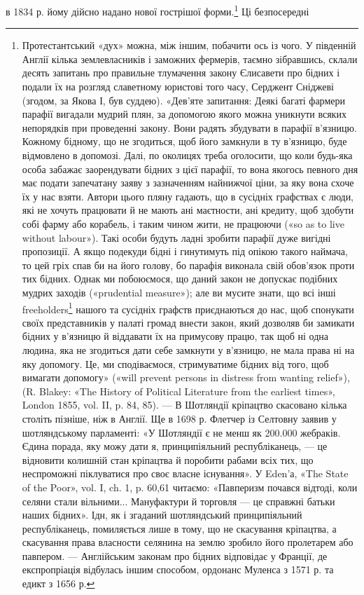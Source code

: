 в 1834 р. йому дійсно надано нової гострішої форми.\footnote{
Протестантський «дух» можна, між іншим, побачити ось із чого.
У південній Англії кілька землевласників і заможних фермерів, таємно
зібравшись, склали десять запитань про правильне тлумачення закону
Єлисавети про бідних і подали їх на розгляд славетному юристові того
часу, Серджент Сніджеві (згодом, за Якова І, був суддею). «Дев’яте запитання:
Деякі багаті фармери парафії вигадали мудрий плян, за допомогою
якого можна уникнути всяких непорядків при проведенні закону.
Вони радять збудувати в парафії в’язницю. Кожному бідному, що не
згодиться, щоб його замкнули в ту в’язницю, буде відмовлено в допомозі.
Далі, по околицях треба оголосити, що коли будь-яка особа забажає
заорендувати бідних з цієї парафії, то вона якогось певного дня
має подати запечатану заяву з зазначенням найнижчої ціни, за яку вона
схоче їх у нас взяти. Автори цього пляну гадають, що в сусідніх графствах
є люди, які не хочуть працювати й не мають ані маєтности, ані
кредиту, щоб здобути собі фарму або корабель, і таким чином жити,
не працюючи («so as to live without labour»). Такі особи будуть ладні
зробити парафії дуже вигідні пропозиції. А якщо подекуди бідні і гинутимуть
під опікою такого наймача, то цей гріх спав би на його голову,
бо парафія виконала свій обов’язок проти тих бідних. Однак ми побоюємося,
що даний закон не допускає подібних мудрих заходів («prudential
measure»); але ви мусите знати, що всі інші freeholders\footnote*{
— вільні дрібні господарства. \emph{Ред.}
} нашого та
сусідніх графств приєднаються до нас, щоб спонукати своїх представників
у палаті громад внести закон, який дозволяв би замикати бідних у
в’язницю й віддавати їх на примусову працю, так щоб ні одна людина,
яка не згодиться дати себе замкнути у в’язницю, не мала права ні на яку
допомогу. Це, ми сподіваємося, стримуватиме бідних від того, щоб вимагати
допомогу» («will prevent persons in distress from wanting relief»),
(R. Blakey: «The History of Political Literature from the earliest times»,
London 1855, vol. II, p. 84, 85). — В Шотляндії кріпацтво скасовано
кілька століть пізніше, ніж в Англії. Ще в 1698 р. Флетчер із Селтовну
заявив у шотляндському парламенті: «У Шотляндії є не менш як 200.000
жебраків. Єдина порада, яку можу дати я, принципіяльний республіканець,
— це відновити колишній стан кріпацтва й поробити рабами всіх
тих, що неспроможні піклуватися про своє власне існування». У Eden’а,
«The State of the Poor», vol. I, ch. 1, p. 60,61 читаємо: «Павперизм почався
відтоді, коли селяни стали вільними... Мануфактури й торговля —
це справжні батьки наших бідних». Ідн, як і згаданий шотляндський
принципіяльний республіканець, помиляється лише в тому, що не скасування
кріпацтва, а скасування права власности селянина на землю
зробило його пролетарем або павпером. — Англійським законам про
бідних відповідає у Франції, де експропріація відбулась іншим способом,
ордонанс Муленса з 1571 р. та едикт з 1656 р.
} Ці безпосередні
